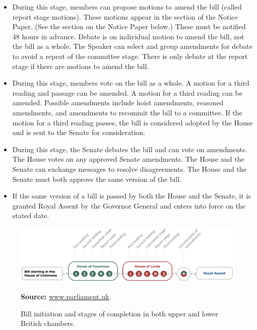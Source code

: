 \begin{itemize}
	\item {} During this stage, members can propose motions to amend the bill (called report stage motions). These motions appear in the  section of the Notice Paper. (See the section on the Notice Paper below.) These must be notified 48 hours in advance. Debate is on individual motion to amend the bill, not the bill as a whole. The Speaker can select and group amendments for debate to avoid a repeat of the committee stage. There is only debate at the report stage if there are motions to amend the bill.
	\item {} During this stage, members vote on the bill as a whole. A motion for a third reading and passage can be amended. A motion for a third reading can be amended. Possible amendments include hoist amendments, reasoned amendments, and amendments to recommit the bill to a committee. If the motion for a third reading passes, the bill is considered adopted by the House and is sent to the Senate for consideration.
	\item {} During this stage, the Senate debates the bill and can vote on amendments. The House votes on any approved Senate amendments. The House and the Senate can exchange messages to resolve disagreements. The House and the Senate must both approve the same version of the bill.
	\item {} If the same version of a bill is passed by both the House and the Senate, it is granted Royal Assent by the Governor General and enters into force on the stated date.
\end{itemize}

\begin{figure}[htbp!]
	\caption{\footnotesize{Bill initiation and stages of completion in both upper and lower British chambers.}}
	\label{fig:legislativeProcess}
	\centering
	\includegraphics[width=\textwidth]{legislativeProcess.png}\\
	\vspace{.5cm}
	\raggedright   \footnotesize{\textbf{Source:} \href{https://www.parliament.uk/about/how/laws/passage-bill/}{www.parliament.uk}.}
\end{figure}


